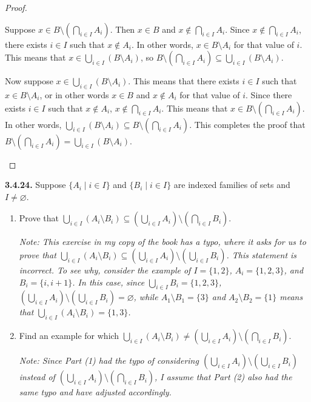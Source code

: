 \documentclass[12pt]{amsart}
\newenvironment{statement}[1]{\smallskip\noindent\color[rgb]{.6627, .3529, .6314} {\bf #1.}}{}
\theoremstyle{definition}
\theoremstyle{remark}
\begin{document}
\begin{proof}
\begin{enumerate}
	Suppose $x \in B \setminus \left( \bigcap_{i \in I} A_i \right)$.
	Then $x \in B$ and $x \notin \bigcap_{i \in I} A_i$.
	Since $x \notin \bigcap_{i \in I} A_i$, there exists $i \in I$ such that $x \notin A_i$.
	In other words, $x \in B \setminus A_i$ for that value of $i$.
	This means that $x \in \bigcup_{i \in I} (B \setminus A_i)$, so 
	$B \setminus \left( \bigcap_{i \in I} A_i \right) \subseteq \bigcup_{i \in I} (B \setminus A_i)$.
	
	Now suppose $x \in \bigcup_{i \in I} (B \setminus A_i)$.
	This means that there exists $i \in I$ such that $x \in B \setminus A_i$, or in other words
	$x \in B$ and $x \notin A_i$ for that value of $i$.
	Since there exists $i \in I$ such that $x \notin A_i$, $x \notin \bigcap_{i \in I} A_i$.
	This means that $x \in B \setminus \left( \bigcap_{i \in I} A_i \right)$.
	In other words, 
	$\bigcup_{i \in I} (B \setminus A_i) \subseteq B \setminus \left( \bigcap_{i \in I} A_i \right)$.
	This completes the proof that $B \setminus \left( \bigcap_{i \in I} A_i \right) = 
	\bigcup_{i \in I} (B \setminus A_i)$.
\end{enumerate}
\end{proof}


\begin{statement}{3.4.24}
Suppose $\{ A_i \mid i \in I \}$ and $\{ B_i \mid i \in I \}$ are indexed families of sets and $I \neq \varnothing$.
\begin{enumerate}
	\item Prove that $\bigcup_{i \in I} (A_i \setminus B_i) \subseteq
	\left( \bigcup_{i \in I} A_i \right) \setminus \left( \bigcap_{i \in I} B_i \right)$.
	
	\emph{
	Note: This exercise in my copy of the book has a typo, where it asks for us to prove that
	$\bigcup_{i \in I} (A_i \setminus B_i) \subseteq
	\left( \bigcup_{i \in I} A_i \right) \setminus \left( \bigcup_{i \in I} B_i \right)$.
	This statement is incorrect.
	To see why, consider the example of 
	$I = \{ 1, 2 \}$, $A_i = \{ 1, 2, 3 \}$, and $B_i = \{ i, i + 1 \}$.
	In this case, since $\bigcup_{i \in I} B_i = \{ 1, 2, 3 \}$,
	$\left( \bigcup_{i \in I} A_i \right) \setminus \left( \bigcup_{i \in I} B_i \right) = \varnothing$,
	while $A_1 \setminus B_1 = \{ 3 \}$ and $A_2 \setminus B_2 = \{ 1 \}$ means that
	$\bigcup_{i \in I} (A_i \setminus B_i) = \{ 1, 3 \}$.
	}
	
	\item Find an example for which $\bigcup_{i \in I} (A_i \setminus B_i) \neq
	\left( \bigcup_{i \in I} A_i \right) \setminus \left( \bigcap_{i \in I} B_i \right)$.
	
	\emph{
	Note: Since Part (1) had the typo of considering 
	$\left( \bigcup_{i \in I} A_i \right) \setminus \left( \bigcup_{i \in I} B_i \right)$ instead of
	$\left( \bigcup_{i \in I} A_i \right) \setminus \left( \bigcap_{i \in I} B_i \right)$,
	I assume that Part (2) also had the same typo and have adjusted accordingly.
	}
\end{enumerate}
\end{statement}
\end{document}
